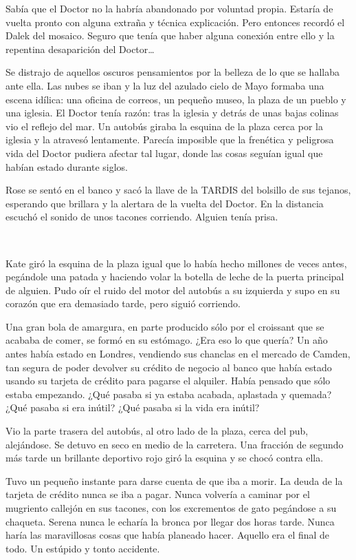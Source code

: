 Sabía que el Doctor no la habría abandonado por voluntad propia. Estaría
de vuelta pronto con alguna extraña y técnica explicación. Pero entonces
recordó el Dalek del mosaico. Seguro que tenía que haber alguna conexión
entre ello y la repentina desaparición del Doctor\ldots{}

Se distrajo de aquellos oscuros pensamientos por la belleza de lo que se
hallaba ante ella. Las nubes se iban y la luz del azulado cielo de Mayo
formaba una escena idílica: una oficina de correos, un pequeño museo, la
plaza de un pueblo y una iglesia. El Doctor tenía razón: tras la iglesia
y detrás de unas bajas colinas vio el reflejo del mar. Un autobús giraba
la esquina de la plaza cerca por la iglesia y la atravesó lentamente.
Parecía imposible que la frenética y peligrosa vida del Doctor pudiera
afectar tal lugar, donde las cosas seguían igual que habían estado
durante siglos.

Rose se sentó en el banco y sacó la llave de la TARDIS del bolsillo de
sus tejanos, esperando que brillara y la alertara de la vuelta del
Doctor. En la distancia escuchó el sonido de unos tacones corriendo.
Alguien tenía prisa.

~

Kate giró la esquina de la plaza igual que lo había hecho millones de
veces antes, pegándole una patada y haciendo volar la botella de leche
de la puerta principal de alguien. Pudo oír el ruido del motor del
autobús a su izquierda y supo en su corazón que era demasiado tarde,
pero siguió corriendo.

Una gran bola de amargura, en parte producido sólo por el croissant que
se acababa de comer, se formó en su estómago. ¿Era eso lo que quería?
Un año antes había estado en Londres, vendiendo sus chanclas en el
mercado de Camden, tan segura de poder devolver su crédito de negocio al
banco que había estado usando su tarjeta de crédito para pagarse el
alquiler. Había pensado que sólo estaba empezando. ¿Qué pasaba si ya
estaba acabada, aplastada y quemada? ¿Qué pasaba si era inútil? ¿Qué
pasaba si la vida era inútil?

Vio la parte trasera del autobús, al otro lado de la plaza, cerca del
pub, alejándose. Se detuvo en seco en medio de la carretera. Una
fracción de segundo más tarde un brillante deportivo rojo giró la
esquina y se chocó contra ella.

Tuvo un pequeño instante para darse cuenta de que iba a morir. La deuda
de la tarjeta de crédito nunca se iba a pagar. Nunca volvería a caminar
por el mugriento callejón en sus tacones, con los excrementos de gato
pegándose a su chaqueta. Serena nunca le echaría la bronca por llegar
dos horas tarde. Nunca haría las maravillosas cosas que había planeado
hacer. Aquello era el final de todo. Un estúpido y tonto accidente.

